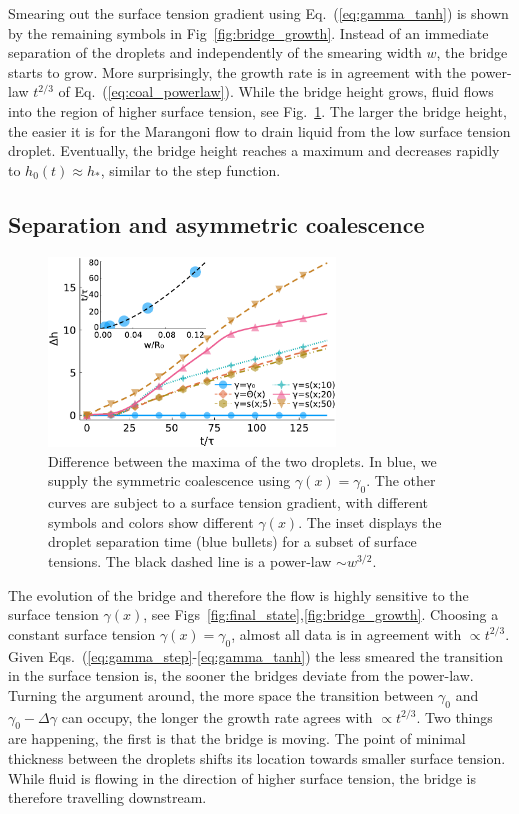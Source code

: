 Smearing out the surface tension gradient using Eq.~(\ref{eq:gamma_tanh}) is shown by the remaining symbols in Fig~\ref{fig:bridge_growth}.
Instead of an immediate separation of the droplets and independently of the smearing width $w$, the bridge starts to grow.
More surprisingly, the growth rate is in agreement with the power-law $t^{2/3}$ of Eq.~(\ref{eq:coal_powerlaw}).
While the bridge height grows, fluid flows into the region of higher surface tension, see Fig.~\ref{fig:drop_diff}.
The larger the bridge height, the easier it is for the Marangoni flow to drain liquid from the low surface tension droplet.
Eventually, the bridge height reaches a maximum and decreases rapidly to $h_0(t) \approx h_{\ast}$, similar to the step function.

\subsection{Separation and asymmetric coalescence}\label{subsec:separation}
\begin{figure}
    \centering
    \includegraphics[width=0.68\textwidth]{graphics/hdiff_inset.pdf}
    \caption{Difference between the maxima of the two droplets.
    In blue, we supply the symmetric coalescence using $\gamma(x) = \gamma_0$.
    The other curves are subject to a surface tension gradient, with different symbols and colors show different $\gamma(x)$.
    The inset displays the droplet separation time (blue bullets) for a subset of surface tensions.
    The black dashed line is a power-law $\sim w^{3/2}$.
    }
    \label{fig:drop_diff}
\end{figure}
The evolution of the bridge and therefore the flow is highly sensitive to the surface tension $\gamma(x)$, see Figs~\ref{fig:final_state},\ref{fig:bridge_growth}.
Choosing a constant surface tension $\gamma(x) = \gamma_0$, almost all data is in agreement with $\propto t^{2/3}$.
Given Eqs.~(\ref{eq:gamma_step}-\ref{eq:gamma_tanh}) the less smeared the transition in the surface tension is, the sooner the bridges deviate from the power-law.
Turning the argument around, the more space the transition between $\gamma_0$ and $\gamma_0-\Delta\gamma$ can occupy, the longer the growth rate agrees with $\propto t^{2/3}$.
Two things are happening, the first is that the bridge is moving.
The point of minimal thickness between the droplets shifts its location towards smaller surface tension.
While fluid is flowing in the direction of higher surface tension, the bridge is therefore travelling downstream.

